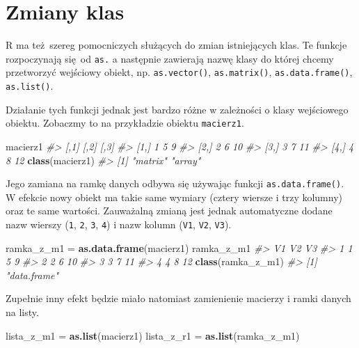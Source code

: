 \documentclass[paper=6in:9in,pagesize=pdftex,headinclude=on,footinclude=on,10pt]{scrbook}
\newenvironment{Shaded}{\begin{snugshade}}{\end{snugshade}}
\newcommand{\CommentTok}[1]{\textcolor[rgb]{0.56,0.35,0.01}{\textit{#1}}}
\newcommand{\KeywordTok}[1]{\textcolor[rgb]{0.13,0.29,0.53}{\textbf{#1}}}
\newcommand{\NormalTok}[1]{#1}
\newcommand{\StringTok}[1]{\textcolor[rgb]{0.31,0.60,0.02}{#1}}
\begin{document}
\hypertarget{zmiany-klas}{%
\section{Zmiany klas}\label{zmiany-klas}}

R ma też~szereg pomocniczych służących do zmian istniejących klas.
Te funkcje rozpoczynają się~od \texttt{as.} a następnie zawierają nazwę klasy do której chcemy przetworzyć wejściowy obiekt, np. \texttt{as.vector()}, \texttt{as.matrix()}, \texttt{as.data.frame()}, \texttt{as.list()}.

Działanie tych funkcji jednak jest bardzo różne w zależności o klasy wejściowego obiektu.
Zobaczmy to na przykładzie obiektu \texttt{macierz1}.

\begin{Shaded}
\begin{Highlighting}[]
\NormalTok{macierz1}
\CommentTok{#>      [,1] [,2] [,3]}
\CommentTok{#> [1,]    1    5    9}
\CommentTok{#> [2,]    2    6   10}
\CommentTok{#> [3,]    3    7   11}
\CommentTok{#> [4,]    4    8   12}
\KeywordTok{class}\NormalTok{(macierz1)}
\CommentTok{#> [1] "matrix" "array"}
\end{Highlighting}
\end{Shaded}

Jego zamiana na ramkę danych odbywa się używając funkcji \texttt{as.data.frame()}.
W efekcie nowy obiekt ma takie same wymiary (cztery wiersze i trzy kolumny) oraz te same wartości.
Zauważalną zmianą jest jednak automatyczne dodane nazw wierszy (\texttt{1}, \texttt{2}, \texttt{3}, \texttt{4}) i nazw kolumn (\texttt{V1}, \texttt{V2}, \texttt{V3}).

\begin{Shaded}
\begin{Highlighting}[]
\NormalTok{ramka_z_m1 =}\StringTok{ }\KeywordTok{as.data.frame}\NormalTok{(macierz1)}
\NormalTok{ramka_z_m1}
\CommentTok{#>   V1 V2 V3}
\CommentTok{#> 1  1  5  9}
\CommentTok{#> 2  2  6 10}
\CommentTok{#> 3  3  7 11}
\CommentTok{#> 4  4  8 12}
\KeywordTok{class}\NormalTok{(ramka_z_m1)}
\CommentTok{#> [1] "data.frame"}
\end{Highlighting}
\end{Shaded}

Zupełnie inny efekt będzie miało natomiast zamienienie macierzy i ramki danych na listy.

\begin{Shaded}
\begin{Highlighting}[]
\NormalTok{lista_z_m1 =}\StringTok{ }\KeywordTok{as.list}\NormalTok{(macierz1)}
\NormalTok{lista_z_r1 =}\StringTok{ }\KeywordTok{as.list}\NormalTok{(ramka_z_m1)}
\end{Highlighting}
\end{Shaded}
\end{document}
